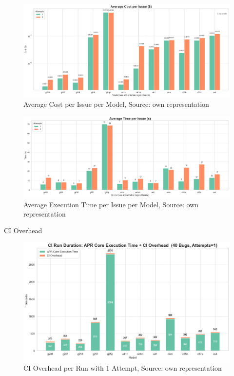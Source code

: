 \begin{figure}[H]
    \centering
    \includegraphics[width=1\textwidth]{images/diagrams/avg_cost_per_issue_per_model_grouped.png}
    \caption{Average Cost per Issue per Model, Source: own representation}
    \label{fig:avg-cost-per-issue}
\end{figure}

\begin{figure}[H]
    \centering
    \includegraphics[width=1\textwidth]{images/diagrams/avg_execution_time_per_issue_per_model_grouped.png}
    \caption{Average Execution Time per Issue per Model, Source: own representation}
    \label{fig:avg-execution-time-per-issue}
\end{figure}


CI Overhead
\begin{figure}[H]
    \centering
    \includegraphics[width=1\textwidth]{images/diagrams/ci_vs_exec_time_per_run_stacked_attempts_1.png}
    \caption{CI Overhead per Run with 1 Attempt, Source: own representation}
    \label{fig:ci-vs-exec-time-per-run-attempts-1}
\end{figure}

